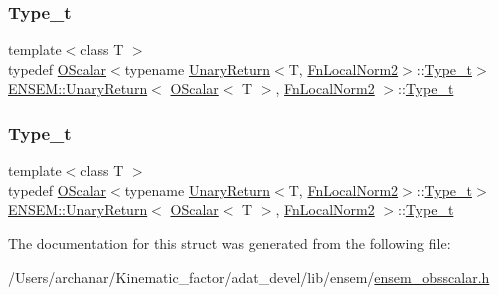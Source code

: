 \subsubsection{\texorpdfstring{Type\_t}{Type\_t}\hspace{0.1cm}{\footnotesize\ttfamily [1/2]}}
{\footnotesize\ttfamily template$<$class T $>$ \\
typedef \mbox{\hyperlink{classENSEM_1_1OScalar}{O\+Scalar}}$<$typename \mbox{\hyperlink{structENSEM_1_1UnaryReturn}{Unary\+Return}}$<$T, \mbox{\hyperlink{structENSEM_1_1FnLocalNorm2}{Fn\+Local\+Norm2}}$>$\+::\mbox{\hyperlink{structENSEM_1_1UnaryReturn_3_01OScalar_3_01T_01_4_00_01FnLocalNorm2_01_4_a610bc1debf55f6071875791495bca2a5}{Type\+\_\+t}}$>$ \mbox{\hyperlink{structENSEM_1_1UnaryReturn}{E\+N\+S\+E\+M\+::\+Unary\+Return}}$<$ \mbox{\hyperlink{classENSEM_1_1OScalar}{O\+Scalar}}$<$ T $>$, \mbox{\hyperlink{structENSEM_1_1FnLocalNorm2}{Fn\+Local\+Norm2}} $>$\+::\mbox{\hyperlink{structENSEM_1_1UnaryReturn_3_01OScalar_3_01T_01_4_00_01FnLocalNorm2_01_4_a610bc1debf55f6071875791495bca2a5}{Type\+\_\+t}}}

\mbox{\label{structENSEM_1_1UnaryReturn_3_01OScalar_3_01T_01_4_00_01FnLocalNorm2_01_4_a610bc1debf55f6071875791495bca2a5}} 
\subsubsection{\texorpdfstring{Type\_t}{Type\_t}\hspace{0.1cm}{\footnotesize\ttfamily [2/2]}}
{\footnotesize\ttfamily template$<$class T $>$ \\
typedef \mbox{\hyperlink{classENSEM_1_1OScalar}{O\+Scalar}}$<$typename \mbox{\hyperlink{structENSEM_1_1UnaryReturn}{Unary\+Return}}$<$T, \mbox{\hyperlink{structENSEM_1_1FnLocalNorm2}{Fn\+Local\+Norm2}}$>$\+::\mbox{\hyperlink{structENSEM_1_1UnaryReturn_3_01OScalar_3_01T_01_4_00_01FnLocalNorm2_01_4_a610bc1debf55f6071875791495bca2a5}{Type\+\_\+t}}$>$ \mbox{\hyperlink{structENSEM_1_1UnaryReturn}{E\+N\+S\+E\+M\+::\+Unary\+Return}}$<$ \mbox{\hyperlink{classENSEM_1_1OScalar}{O\+Scalar}}$<$ T $>$, \mbox{\hyperlink{structENSEM_1_1FnLocalNorm2}{Fn\+Local\+Norm2}} $>$\+::\mbox{\hyperlink{structENSEM_1_1UnaryReturn_3_01OScalar_3_01T_01_4_00_01FnLocalNorm2_01_4_a610bc1debf55f6071875791495bca2a5}{Type\+\_\+t}}}



The documentation for this struct was generated from the following file\+:\begin{DoxyCompactItemize}
\item 
/\+Users/archanar/\+Kinematic\+\_\+factor/adat\+\_\+devel/lib/ensem/\mbox{\hyperlink{lib_2ensem_2ensem__obsscalar_8h}{ensem\+\_\+obsscalar.\+h}}\end{DoxyCompactItemize}
